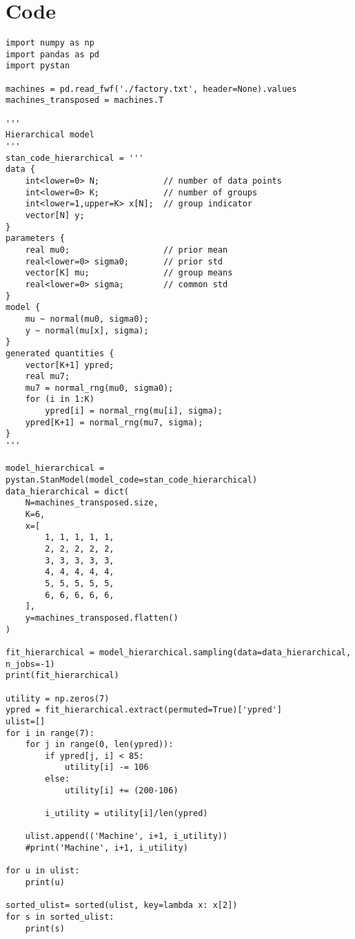 \documentclass{article}
\begin{document}
\section{Code}
\begin{verbatim}
import numpy as np
import pandas as pd
import pystan

machines = pd.read_fwf('./factory.txt', header=None).values
machines_transposed = machines.T

'''
Hierarchical model
'''
stan_code_hierarchical = '''
data {
    int<lower=0> N;             // number of data points
    int<lower=0> K;             // number of groups
    int<lower=1,upper=K> x[N];  // group indicator
    vector[N] y;
}
parameters {
    real mu0;                   // prior mean
    real<lower=0> sigma0;       // prior std
    vector[K] mu;               // group means
    real<lower=0> sigma;        // common std
}
model {
    mu ~ normal(mu0, sigma0);
    y ~ normal(mu[x], sigma);
}
generated quantities {
    vector[K+1] ypred;
    real mu7;
    mu7 = normal_rng(mu0, sigma0);
    for (i in 1:K)
        ypred[i] = normal_rng(mu[i], sigma);
    ypred[K+1] = normal_rng(mu7, sigma);
}
'''

model_hierarchical = pystan.StanModel(model_code=stan_code_hierarchical)
data_hierarchical = dict(
    N=machines_transposed.size,
    K=6,
    x=[
        1, 1, 1, 1, 1,
        2, 2, 2, 2, 2,
        3, 3, 3, 3, 3,
        4, 4, 4, 4, 4,
        5, 5, 5, 5, 5,
        6, 6, 6, 6, 6,
    ],
    y=machines_transposed.flatten()
)

fit_hierarchical = model_hierarchical.sampling(data=data_hierarchical, n_jobs=-1)
print(fit_hierarchical)

utility = np.zeros(7)
ypred = fit_hierarchical.extract(permuted=True)['ypred']
ulist=[]
for i in range(7):
    for j in range(0, len(ypred)):
        if ypred[j, i] < 85:
            utility[i] -= 106
        else:
            utility[i] += (200-106)

        i_utility = utility[i]/len(ypred)
    
    ulist.append(('Machine', i+1, i_utility))
    #print('Machine', i+1, i_utility)

for u in ulist:
    print(u)

sorted_ulist= sorted(ulist, key=lambda x: x[2])
for s in sorted_ulist:
    print(s) 
\end{verbatim}
\end{document}
